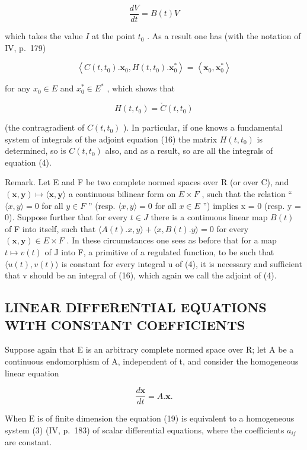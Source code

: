 \[
\frac {d V}{d t} = B (t) V\tag{17}
\]

which takes the value \(I\) at the point \(t_0\) . As a result one has (with the notation of IV, p.~179)

\[
\left\langle C (t, t _ {0}). \mathbf {x} _ {0}, H (t, t _ {0}). \mathbf {x} _ {0} ^ {*} \right\rangle = \left\langle \mathbf {x} _ {0}, \mathbf {x} _ {0} ^ {*} \right\rangle
\]

for any \(x_{0} \in E\) and \(x_{0}^{*} \in E^{*}\) , which shows that

\[
H (t, t _ {0}) = \check {C} (t, t _ {0})\tag{18}
\]

(the contragradient of \(C(t, t_{0})\) ). In particular, if one knows a fundamental system of integrals of the adjoint equation (16) the matrix \(H(t, t_{0})\) is determined, so is \(C(t, t_{0})\) also, and as a result, so are all the integrals of equation (4).

Remark. Let E and F be two complete normed spaces over R (or over C), and \((\mathbf{x}, \mathbf{y}) \mapsto \langle \mathbf{x}, \mathbf{y} \rangle\) a continuous bilinear form on \(E \times F\) , such that the relation `` \(\langle x, y \rangle = 0\) for all \(y \in F\) '' (resp. \(\langle x, y \rangle = 0\) for all \(x \in E\) '') implies x = 0 (resp. y = 0). Suppose further that for every \(t \in J\) there is a continuous linear map \(B(t)\) of F into itself, such that \(\langle A(t).x, y \rangle + \langle x, B(t).y \rangle = 0\) for every \((\mathbf{x}, \mathbf{y}) \in E \times F\) . In these circumstances one sees as before that for a map \(t \mapsto v(t)\) of J into F, a primitive of a regulated function, to be such that \(\langle u(t), v(t) \rangle\) is constant for every integral u of (4), it is necessary and sufficient that v should be an integral of (16), which again we call the adjoint of (4).

\subsection{LINEAR DIFFERENTIAL EQUATIONS WITH CONSTANT COEFFICIENTS}

Suppose again that E is an arbitrary complete normed space over R; let A be a continuous endomorphism of A, independent of t, and consider the homogeneous linear equation

\[
{\frac {d \mathbf {x}}{d t}} = A. \mathbf {x}.\tag{19}
\]

When \(\mathrm{E}\) is of finite dimension the equation (19) is equivalent to a homogeneous system (3) (IV, p.~183) of scalar differential equations, where the coefficients \(a_{ij}\) are constant.

